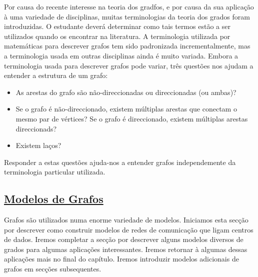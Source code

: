 Por causa do recente interesse na teoria dos gradfos, e por causa da sua
aplicação à uma variedade de disciplinas, muitas terminologias da teoria dos
grados foram introduzidas. O estudante deverá determinar como tais termos estão
a ser utilizados quando os encontrar na literatura. A terminologia utilizada por
matemáticas para descrever grafos tem sido padronizada incrementalmente, mas a
terminologia usada em outras disciplinas ainda é muito variada. Embora a
terminologia usada para descrever grafos pode variar, três questões nos ajudam a
entender a estrutura de um grafo:
\begin{itemize}
  \item As arestas do grafo são não-direccionadas ou direccionadas (ou ambas)?
  \item Se o grafo é não-direccionado, existem múltiplas arestas que conectam o
  mesmo par de vértices? Se o grafo é direccionado, existem múltiplas arestas
  direccionads?
  \item Existem laços?
\end{itemize}

Responder a estas questões ajuda-nos a entender grafos independemente da
terminologia particular utilizada.


\subsection*{\underline{Modelos de Grafos}}

Grafos são utilizados numa enorme variedade de modelos. Iniciamos esta secção
por descrever como construir modelos de redes de comunicação que ligam centros
de dados. Iremos completar a secção por descrever alguns modelos diversos de
grados para algumas aplicações interessantes. Iremos retornar à algumas dessas
aplicações mais no final do capítulo. Iremos introduzir modelos adicionais de
grafos em secções subsequentes.

